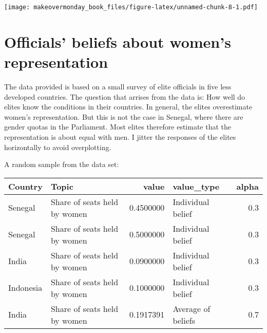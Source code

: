 \documentclass[]{book}
\theoremstyle{definition}
\theoremstyle{definition}
\theoremstyle{definition}
\theoremstyle{remark}
\begin{document}
\texttt{[image: makeovermonday\_book\_files/figure-latex/unnamed-chunk-8-1.pdf]}

\chapter{Officials' beliefs about women's
representation}\label{officials-beliefs-about-womens-representation}

The data provided is based on a small survey of elite officials in five
less developed countries. The question that arrises from the data is:
How well do elites know the conditions in their countries. In general,
the elites overestimate women's representation. But this is not the case
in Senegal, where there are gender quotas in the Parliament. Most elites
therefore estimate that the representation is about equal with men. I
jitter the responses of the elites horizontally to avoid overplotting.

A random sample from the data set:

\begin{tabular}{l|l|r|l|r}
\hline
Country & Topic & value & value\_type & alpha\\
\hline
Senegal & Share of seats held by women & 0.4500000 & Individual belief & 0.3\\
\hline
Senegal & Share of seats held by women & 0.5000000 & Individual belief & 0.3\\
\hline
India & Share of seats held by women & 0.0900000 & Individual belief & 0.3\\
\hline
Indonesia & Share of seats held by women & 0.1000000 & Individual belief & 0.3\\
\hline
India & Share of seats held by women & 0.1917391 & Average of beliefs & 0.7\\
\hline
\end{tabular}
\end{document}
